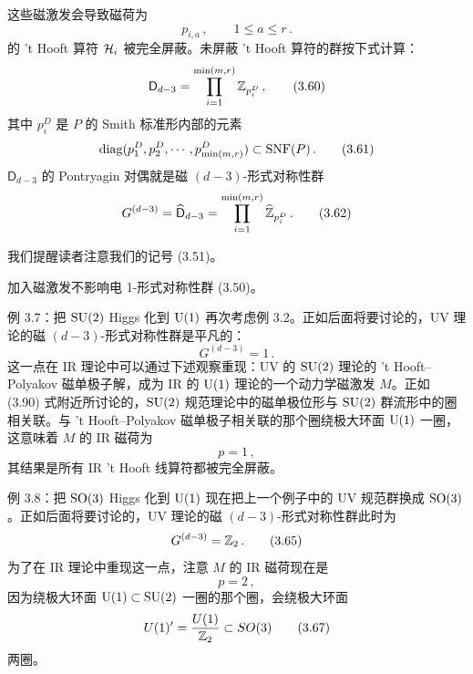 这些磁激发会导致磁荷为
\begin{equation}
  p_{i,a}\,,\qquad 1\le a\le r\,. \tag{3.59}
\end{equation}
的 't Hooft 算符 $\mathcal{H}_i$ 被完全屏蔽。未屏蔽 't Hooft 算符的群按下式计算：
\begin{equation}
  \mathsf{D}_{d-3}=\prod_{i=1}^{\min(m,r)}\mathbb{Z}_{p_i^D}\,, \tag{3.60}
\end{equation}
其中 $p_i^D$ 是 $P$ 的 Smith 标准形内部的元素
\begin{equation}
  \operatorname{diag}(p_1^D,p_2^D,\cdots,p_{\min(m,r)}^D)\subset \mathrm{SNF}(P)\,. \tag{3.61}
\end{equation}
$\mathsf{D}_{d-3}$ 的 Pontryagin 对偶就是磁 $(d-3)$-形式对称性群
\begin{equation}
  G^{(d-3)}=\widehat{\mathsf{D}}_{d-3}=\prod_{i=1}^{\min(m,r)}\widehat{\mathbb{Z}}_{p_i^D}\,. \tag{3.62}
\end{equation}

我们提醒读者注意我们的记号 (3.51)。

加入磁激发不影响电 1-形式对称性群 (3.50)。

\begin{examplebox}{例 3.7：把 $\mathrm{SU}(2)$ Higgs 化到 $\mathrm{U}(1)$}
再次考虑例 3.2。正如后面将要讨论的，UV 理论的磁 $(d-3)$-形式对称性群是平凡的：
\begin{equation}
  G^{(d-3)}=1\,. \tag{3.63}
\end{equation}
这一点在 IR 理论中可以通过下述观察重现：UV 的 $\mathrm{SU}(2)$ 理论的 't Hooft--Polyakov 磁单极子解，成为 IR 的 $\mathrm{U}(1)$ 理论的一个动力学磁激发 $M$。正如 (3.90) 式附近所讨论的，$\mathrm{SU}(2)$ 规范理论中的磁单极位形与 $\mathrm{SU}(2)$ 群流形中的圈相关联。与 't Hooft--Polyakov 磁单极子相关联的那个圈绕极大环面 $\mathrm{U}(1)$ 一圈，这意味着 $M$ 的 IR 磁荷为
\begin{equation}
  p=1\,, \tag{3.64}
\end{equation}
其结果是所有 IR 't Hooft 线算符都被完全屏蔽。
\end{examplebox}

\begin{examplebox}{例 3.8：把 $\mathrm{SO}(3)$ Higgs 化到 $\mathrm{U}(1)$}
现在把上一个例子中的 UV 规范群换成 $\mathrm{SO}(3)$。正如后面将要讨论的，UV 理论的磁 $(d-3)$-形式对称性群此时为
\begin{equation}
  G^{(d-3)}=\mathbb{Z}_2\,. \tag{3.65}
\end{equation}
为了在 IR 理论中重现这一点，注意 $M$ 的 IR 磁荷现在是
\begin{equation}
  p=2\,, \tag{3.66}
\end{equation}
因为绕极大环面 $\mathrm{U}(1)\subset \mathrm{SU}(2)$ 一圈的那个圈，会绕极大环面
\begin{equation}
  U(1)'=\frac{U(1)}{\mathbb{Z}_2}\subset SO(3) \tag{3.67}
\end{equation}
两圈。
\end{examplebox}

